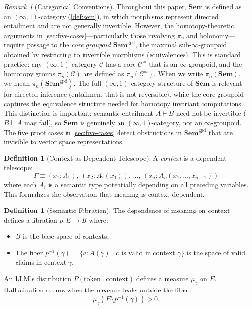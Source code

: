 \documentclass[11pt,a4paper]{article}
\theoremstyle{plain}
\theoremstyle{definition}
\newtheorem{definition}[theorem]{Definition}
\theoremstyle{remark}
\newtheorem{remark}[theorem]{Remark}
\newcommand{\Sem}{\mathbf{Sem}}
\begin{document}
\begin{remark}[Categorical Conventions]
\label{rem:categorical-conventions}
Throughout this paper, $\Sem$ is defined as an $(\infty,1)$-category (\cref{def:sem}), in which morphisms represent directed entailment and are not generally invertible. However, the homotopy-theoretic arguments in \cref{sec:five-cases}---particularly those involving $\pi_n$ and holonomy---require passage to the \emph{core groupoid} $\Sem^{\mathrm{gpd}}$, the maximal sub-$\infty$-groupoid obtained by restricting to invertible morphisms (equivalences). This is standard practice: any $(\infty,1)$-category $\mathcal{C}$ has a core $\mathcal{C}^{\simeq}$ that is an $\infty$-groupoid, and the homotopy groups $\pi_n(\mathcal{C})$ are defined as $\pi_n(\mathcal{C}^{\simeq})$. When we write $\pi_n(\Sem)$, we mean $\pi_n(\Sem^{\mathrm{gpd}})$. The full $(\infty,1)$-category structure of $\Sem$ is relevant for directed inference (entailment that is not reversible), while the core groupoid captures the equivalence structure needed for homotopy invariant computations. This distinction is important: semantic entailment $A \vdash B$ need not be invertible ($B \vdash A$ may fail), so $\Sem$ is genuinely an $(\infty,1)$-category, not an $\infty$-groupoid. The five proof cases in \cref{sec:five-cases} detect obstructions in $\Sem^{\mathrm{gpd}}$ that are invisible to vector space representations.
\end{remark}

\begin{definition}[Context as Dependent Telescope]
\label{def:context}
A \emph{context} is a dependent telescope:
\[
\Gamma \equiv (x_1 : A_1),\, (x_2 : A_2(x_1)),\, \ldots,\, (x_n : A_n(x_1, \ldots, x_{n-1}))
\]
where each $A_i$ is a semantic type potentially depending on all preceding variables. This formalizes the observation that meaning is context-dependent.
\end{definition}

\begin{definition}[Semantic Fibration]
\label{def:fibration}
The dependence of meaning on context defines a fibration $p: E \to B$ where:
\begin{itemize}[nosep]
  \item $B$ is the base space of contexts;
  \item The fiber $p^{-1}(\gamma) = \{a : A(\gamma) \mid a \text{ is valid in context } \gamma\}$ is the space of valid claims in context $\gamma$.
\end{itemize}
An LLM's distribution $P(\text{token} \mid \text{context})$ defines a measure $\mu_\gamma$ on $E$. Hallucination occurs when the measure leaks outside the fiber:
\begin{equation}
\label{eq:hallucination-measure}
\mu_\gamma(E \setminus p^{-1}(\gamma)) > 0.
\end{equation}
\end{definition}
\end{document}

